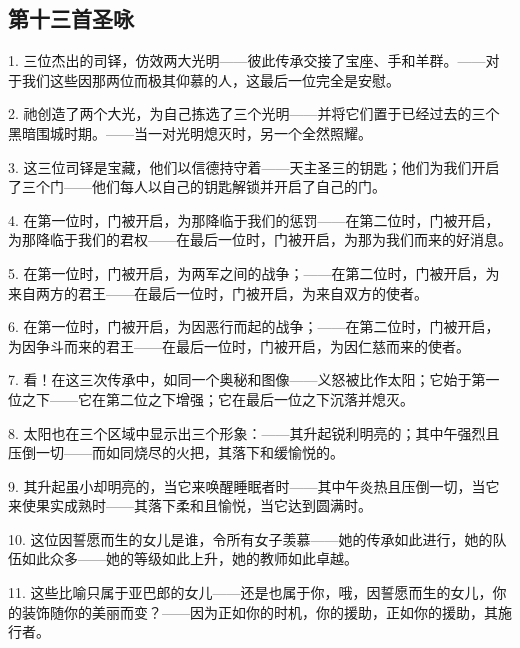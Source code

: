 \subsection{第十三首圣咏}

\par

1. 三位杰出的司铎，仿效两大光明——彼此传承交接了宝座、手和羊群。——对于我们这些因那两位而极其仰慕的人，这最后一位完全是安慰。\par

2. 祂创造了两个大光，为自己拣选了三个光明——并将它们置于已经过去的三个黑暗围城时期。——当一对光明熄灭时，另一个全然照耀。\par

3. 这三位司铎是宝藏，他们以信德持守着——天主圣三的钥匙；他们为我们开启了三个门——他们每人以自己的钥匙解锁并开启了自己的门。\par

4. 在第一位时，门被开启，为那降临于我们的惩罚——在第二位时，门被开启，为那降临于我们的君权——在最后一位时，门被开启，为那为我们而来的好消息。\par

5. 在第一位时，门被开启，为两军之间的战争；——在第二位时，门被开启，为来自两方的君王——在最后一位时，门被开启，为来自双方的使者。\par

6. 在第一位时，门被开启，为因恶行而起的战争；——在第二位时，门被开启，为因争斗而来的君王——在最后一位时，门被开启，为因仁慈而来的使者。\par

7. 看！在这三次传承中，如同一个奥秘和图像——义怒被比作太阳；它始于第一位之下——它在第二位之下增强；它在最后一位之下沉落并熄灭。\par

8. 太阳也在三个区域中显示出三个形象：——其升起锐利明亮的；其中午强烈且压倒一切——而如同烧尽的火把，其落下和缓愉悦的。\par

9. 其升起虽小却明亮的，当它来唤醒睡眠者时——其中午炎热且压倒一切，当它来使果实成熟时——其落下柔和且愉悦，当它达到圆满时。\par

10. 这位因誓愿而生的女儿是谁，令所有女子羡慕——她的传承如此进行，她的队伍如此众多——她的等级如此上升，她的教师如此卓越。\par

11. 这些比喻只属于亚巴郎的女儿——还是也属于你，哦，因誓愿而生的女儿，你的装饰随你的美丽而变？——因为正如你的时机，你的援助，正如你的援助，其施行者。\par

